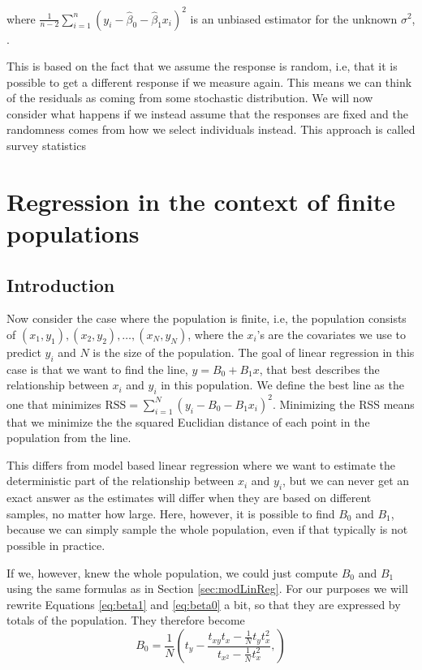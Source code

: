 \documentclass{article}
\begin{document}
where \(\frac{1}{n - 2} \sum_{i = 1}^n\left( y_i - \hat{\beta}_0 -
 \hat{\beta}_1 x_i \right)^2\) is an
unbiased estimator for the unknown \(\sigma^2\), \cite[Chapter 11]{st1101}.

This is based on the fact that we assume the response is random, i.e, that
it is possible to get a different response if we measure again. This means we
can think of the residuals as coming from some stochastic distribution. We will
now consider what happens if we instead assume that the responses are fixed and the
randomness comes from how we select individuals instead.
This approach is called survey statistics


\section{Regression in the context of finite populations} \label{sec:RegFinPop}

\subsection{Introduction}

Now consider the case where the population is finite, i.e, the population
consists of \((x_1, y_1),
(x_2, y_2), \dots , (x_N, y_N)\), where the \(x_i\)'s are the covariates we use to
predict \(y_i\) and \(N\) is the size of the population.
The goal of linear regression in this case is that we want to find the
line, \(y = B_0 + B_1x\), that best describes the relationship between \(x_i\)
and \(y_i\) in this population. We define the best line as the one
that minimizes \(\mathrm{RSS} = \sum_{i = 1}^N (y_i - B_0 - B_1 x_i)^2\).
Minimizing the RSS means that we minimize the the squared Euclidian distance of each point
in the population from the line.

This differs from model based linear regression where we want to estimate the
deterministic part of the relationship between \(x_i\) and \(y_i\), but we can
never get an exact answer as the estimates will differ when they are based on
different samples, no matter how large. Here, however, it is possible to find \(B_0\) and
\(B_1\), because we can simply sample the whole population, even if that typically
is not possible in practice.

If we, however, knew the whole population, we could just compute \(B_0\) and \(B_1\) using the same formulas
as in Section \ref{sec:modLinReg}. For our purposes we will rewrite Equations
\ref{eq:beta1} and \ref{eq:beta0} a bit,
so that they are expressed by totals of the population. They therefore become
\begin{equation} \label{eq:B0}
 B_0 = \frac{1}{N} \left( t_y - \frac{t_{xy} t_x - \frac{1}{N} t_y t_x^2}
   {t_{x^2} - \frac{1}{N} t_x^2},
  \right)
\end{equation}
\end{document}
